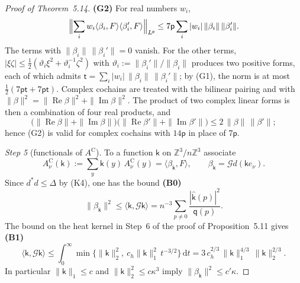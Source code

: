 \documentclass[11pt]{amsart}
\theoremstyle{definition}
\begin{document}
\begin{proof}[Proof of Theorem~5.14]
\textbf{(G2)} For real numbers $w_i$,
\begin{equation*}
\Bigl\|\sum_iw_i\langle\beta_i,F\rangle\langle\beta_i',F\rangle\Bigr\|_{L^{\mathsf p}}\le7\mathsf p\sum_i|w_i|\,\|\beta_i\|\,\|\beta_i'\|.
\end{equation*}
The terms with $\|\beta_i\|\,\|\beta_i'\|=0$ vanish.
For the other terms, $|\xi\zeta|\le\frac12(\vartheta_i\xi^2+\vartheta_i^{-1}\zeta^2)$ with $\vartheta_i:=\|\beta_i'\|/\|\beta_i\|$ produces two positive forms, each of which admits $\mathsf t=\sum_i|w_i|\,\|\beta_i\|\,\|\beta_i'\|$;
by (G1), the norm is at most $\frac12(7\mathsf p\mathsf t+7\mathsf p\mathsf t)$.
Complex cochains are treated with the bilinear pairing and with $\|\beta\|^2=\allowbreak \|\operatorname{Re}\beta\|^2+\|\operatorname{Im}\beta\|^2$.
The product of two complex linear forms is then a combination of four real products, and
\begin{equation*}
\bigl(\|\operatorname{Re}\beta\|+\|\operatorname{Im}\beta\|\bigr)\bigl(\|\operatorname{Re}\beta'\|+\|\operatorname{Im}\beta'\|\bigr)\le2\,\|\beta\|\,\|\beta'\|;
\end{equation*}
hence (G2) is valid for complex cochains with $14\mathsf p$ in place of $7\mathsf p$.

\emph{Step 5} (functionals of $A^{\mathrm C}$).
To a function $\mathsf k$ on $\mathbb Z^3/n\mathbb Z^3$ associate
\begin{equation*}
A^{\mathrm C}_\nu(\mathsf k):=\sum_y\mathsf k(y)\,A^{\mathrm C}_\nu(y)=\langle\beta_{\mathsf k},F\rangle,\qquad\beta_{\mathsf k}=\mathcal Gd(\mathsf ke_\nu).
\end{equation*}
Since $d^*d\le\Delta$ by (K4), one has the bound \textbf{(B0)}
\begin{equation}
\tag{B0}
\|\beta_{\mathsf k}\|^2\le\langle\mathsf k,\mathcal G\mathsf k\rangle=n^{-3}\sum_{p\ne0}\frac{|\hat{\mathsf k}(p)|^2}{\mathsf q(p)}.
\end{equation}
The bound on the heat kernel in Step~6 of the proof of Proposition~5.11 gives \textbf{(B1)}
\begin{equation}
\tag{B1}
\langle\mathsf k,\mathcal G\mathsf k\rangle\le\int_0^\infty\min\bigl\{\|\mathsf k\|_2^2,\ c_h\|\mathsf k\|_1^2\,t^{-3/2}\bigr\}\,\mathrm dt=3\,c_h^{2/3}\,\|\mathsf k\|_1^{4/3}\,\|\mathsf k\|_2^{2/3}.
\end{equation}
In particular $\|\mathsf k\|_1\le c$ and $\|\mathsf k\|_2^2\le c\kappa^3$ imply $\|\beta_{\mathsf k}\|^2\le c'\kappa$.


\end{proof}
\end{document}
